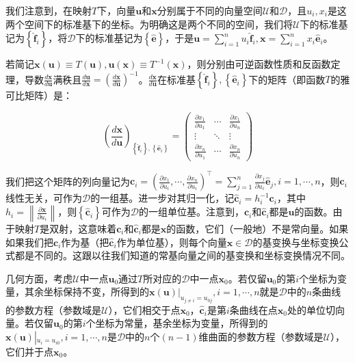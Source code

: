 \documentclass[../main.tex]{subfiles}
\begin{document}
我们注意到，在映射$T$下，向量$\mathbf{u}$和$\mathbf{x}$分别属于不同的向量空间$\mathcal{U}$和$\mathcal{D}$，且$u_i,x_i$是这两个空间下的标准基下的坐标。为明确这是两个不同的空间，我们将$\mathcal{U}$下的标准基记为$\left\{\mathbf{\hat{f}}_i\right\}$，将$\mathcal{D}$下的标准基记为$\left\{\mathbf{\hat{e}}\right\}$，于是$\mathbf{u}=\sum_{i=1}^nu_i\mathbf{\hat{f}}_i,\mathbf{x}=\sum_{i=1}^nx_i\mathbf{\hat{e}}_i$。

若简记$\mathbf{x}\left(\mathbf{u}\right)\equiv T\left(\mathbf{u}\right),\mathbf{u}\left(\mathbf{x}\right)\equiv T^{-1}\left(\mathbf{x}\right)$，则分别由可逆函数性质和反函数定理，导数$\frac{d\mathbf{x}}{d\mathbf{u}}$满秩且$\frac{d\mathbf{u}}{d\mathbf{x}}=\left(\frac{d\mathbf{x}}{d\mathbf{u}}\right)^{-1}$。$\frac{d\mathbf{x}}{d\mathbf{u}}$在标准基$\left\{\mathbf{\hat{f}}_i\right\},\left\{\mathbf{\hat{e}}_i\right\}$下的矩阵（即函数$T$的雅可比矩阵）是：

\[\left(\frac{d\mathbf{x}}{d\mathbf{u}}\right)_{\left\{\mathbf{\hat{f}}_i\right\},\left\{\mathbf{\hat{e}}_i\right\}}=\left(\begin{array}{ccc}
            \frac{\partial x_1}{\partial u_1} & \cdots & \frac{\partial x_1}{\partial u_n} \\
            \vdots                            & \ddots & \vdots                            \\
            \frac{\partial x_n}{\partial u_1} & \cdots & \frac{\partial x_n}{\partial u_n}\end{array}\right)\]

我们把这个矩阵的列向量记为$\mathbf{c}_i=\left(\frac{\partial x_1}{\partial u_i},\cdots,\frac{\partial x_n}{\partial u_i}\right)^\intercal=\sum_{j=1}^n\frac{\partial x_j}{\partial u_i}\mathbf{\hat{e}}_j,i=1,\cdots,n$，则$\mathbf{c}_i$线性无关，可作为$\mathcal{D}$的一组基。进一步对其归一化，记$\mathbf{\hat{c}}_i=h_i^{-1}\mathbf{c}_i$，其中$h_i=\left\|\frac{\partial\mathbf{x}}{\partial u_i}\right\|$，则$\left\{\mathbf{\hat{c}}_i\right\}$可作为$\mathcal{D}$的一组单位基。注意到，$\mathbf{c}_i$和$\mathbf{\hat{c}}_i$都是$\mathbf{u}$的函数。由于映射$T$是双射，这意味着$\mathbf{c}_i$和$\mathbf{\hat{c}}_i$都是$\mathbf{x}$的函数，它们（一般地）不是常向量。如果如果我们把$\mathbf{c}_i$作为基（把$\mathbf{\hat{c}}_i$作为单位基），则每个向量$\mathbf{x}\in\mathcal{D}$的基变换与坐标变换公式都是不同的。这跟以往我们知道的常基向量之间的基变换和坐标变换情况不同。

几何方面，考虑$\mathcal{U}$中一点$\mathbf{u}_0$通过$T$所对应的$\mathcal{D}$中一点$\mathbf{x}_0$。若仅留$\mathbf{u}_0$的第$i$个坐标为变量，其余坐标保持不变，所得到的$\left.\mathbf{x}\left(\mathbf{u}\right)\right|_{u_{j\neq i}=u_{0j}},i=1,\cdots,n$就是$\mathcal{D}$中的$n$条曲线的参数方程（参数域是$\mathcal{U}$），它们相交于点$\mathbf{x}_0$，$\mathbf{\hat{c}}_i$是第$i$条曲线在点$\mathbf{x}_0$处的单位切向量。若仅留$\mathbf{u}_0$的第$i$个坐标为常量，基余坐标为变量，所得到的$\mathbf{x}\left(\mathbf{u}\right)\left|_{u_i=u_{i0}}\right.,i=1,\cdots,n$是$\mathcal{D}$中的$n$个$\left(n-1\right)$维曲面的参数方程（参数域是$\mathcal{U}$），它们并于点$\mathbf{x}_0$。
\end{document}

